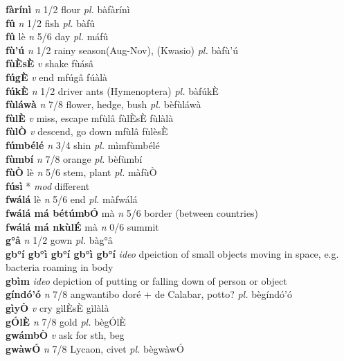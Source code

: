 \documentclass{article}
\begin{document}
{\bf fàrínì}  {\it n} 1/2 flour {\it pl.} bàfàrínì         \\ 
{\bf fû}  {\it n} 1/2 fish {\it pl.} bàfû         \\ 
{\bf fû} lè {\it n} 5/6 day {\it pl.} máfû         \\ 
{\bf fù'ú}  {\it n} 1/2 rainy season(Aug-Nov), (Kwasio) {\it pl.} bàfù'ú         \\ 
{\bf fùÈsÈ}  {\it v} shake   fùásâ      \\ 
{\bf fúgÈ}  {\it v} end   mfúgâ   fúàlà   \\ 
{\bf fúkÈ}  {\it n} 1/2 driver ants (Hymenoptera) {\it pl.} bàfúkÈ         \\ 
{\bf fùláwà}  {\it n} 7/8 flower, hedge, bush {\it pl.} bèfùláwà         \\ 
{\bf fùlÈ}  {\it v} miss, escape   mfùlâ  fùlÈsÈ fùlàlà   \\ 
{\bf fùlÒ}  {\it v} descend, go down   mfùlâ  fùlèsÈ    \\ 
{\bf fúmbélé}  {\it n} 3/4 shin {\it pl.} mìmfùmbélé         \\ 
{\bf fùmbí}  {\it n} 7/8 orange {\it pl.} bèfùmbí         \\ 
{\bf fùÒ} lè {\it n} 5/6 stem, plant {\it pl.} màfùÒ         \\ 
{\bf fúsì} * {\it mod} different         \\ 
{\bf fwálá} lè {\it n} 5/6 end {\it pl.} màfwálá         \\ 
{\bf fwálá má bétúmbÓ} mà {\it  n} 5/6 border (between countries)         \\ 
{\bf fwálá má nkùlÉ} mà {\it n} 0/6 summit         \\ 
{\bf g°â}  {\it n} 1/2 gown {\it pl.} bàg°â         \\ 
{\bf gb°í gb°ì gb°í gb°ì gb°í}  {\it ideo} dpeiction of small objects moving in space, e.g. bacteria roaming in body         \\ 
{\bf gbìm}  {\it ideo} depiction of putting or falling down of person or object         \\ 
{\bf gíndó'ó}  {\it n} 7/8 angwantibo  doré + de Calabar, potto? {\it pl.} bègíndó'ó         \\ 
{\bf gìyÒ}  {\it v} cry     gìlÈsÈ gìlàlà   \\ 
{\bf gÓlÈ}  {\it n} 7/8 gold {\it pl.} bègÓlÈ         \\ 
{\bf gwámbÒ}  {\it v} ask for sth, beg         \\ 
{\bf gwàwÓ}  {\it n} 7/8 Lycaon, civet {\it pl.} bègwàwÓ         \\ 
\end{document}
